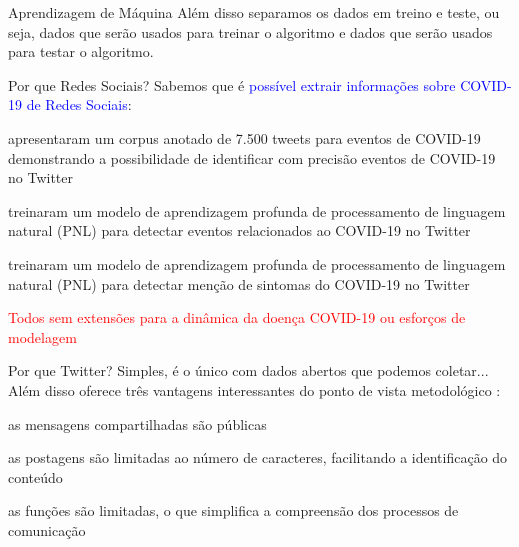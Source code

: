\documentclass[aspectratio=169]{beamer}                    %
\begin{document}
\begin{frame}{Aprendizagem de Máquina}
    Além disso separamos os dados em treino e teste, ou seja, dados que serão usados para treinar o algoritmo e dados que serão usados para testar o algoritmo.
    \begin{figure}
        \centering
    \end{figure}
\end{frame}

\begin{frame}{Por que Redes Sociais?}
    Sabemos que é \textcolor{blue}{possível extrair informações sobre COVID-19 de Redes Sociais}:
    \begin{vfilleditems}
        \item \textcite{zongExtractingCOVID19Events2020} apresentaram um corpus anotado de 7.500 tweets para eventos de COVID-19 demonstrando a possibilidade de identificar com precisão eventos de COVID-19 no Twitter
        \item \textcite{Kaushal_2020} treinaram um modelo de aprendizagem profunda de processamento de linguagem natural (PNL) para detectar eventos relacionados ao COVID-19 no Twitter
        \item \textcite{santosh2020detecting} treinaram um modelo de aprendizagem profunda de processamento de linguagem natural (PNL) para detectar menção de sintomas do COVID-19 no Twitter
    \end{vfilleditems}
    \textcolor{red}{Todos sem extensões para a dinâmica da doença COVID-19 ou esforços de modelagem}
\end{frame}

\begin{frame}{Por que Twitter?}
    Simples, é o único com dados abertos que podemos coletar...
    \vfill
    Além disso oferece três vantagens interessantes do ponto de vista metodológico \parencite{GomezCarrasco2020}:
    \begin{vfilleditems}
        \item as mensagens compartilhadas são públicas
        \item as postagens são limitadas ao número de caracteres, facilitando a identificação do conteúdo
        \item as funções são limitadas, o que simplifica a compreensão dos processos de comunicação
    \end{vfilleditems}
\end{frame}
\end{document}
